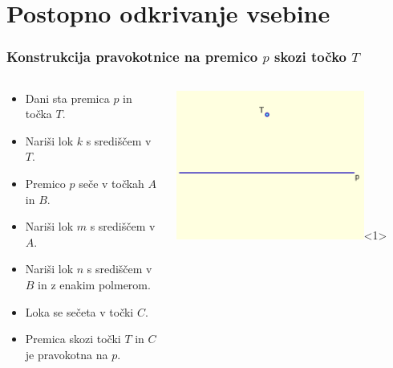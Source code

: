 \documentclass[11pt,hyperref={unicode}]{beamer}
\begin{document}
\section{Postopno odkrivanje vsebine}
\begin{frame}
   \frametitle{Konstrukcija pravokotnice na premico $ p $ skozi točko $ T $}
   \begin{columns}
      \begin{column}{0.5\textwidth}
         \begin{itemize}
            \item <1->Dani sta premica $ p $  in točka $ T $.
            \item <2->Nariši lok $ k $ s središčem v $ T $.
            \item <3->Premico $ p $ seče v točkah $ A $ in $ B $.
            \item <4->Nariši lok  $ m $ s središčem v $ A $.
            \item <5->Nariši lok $ n $ s središčem v $ B $ in z enakim 
            polmerom.
            \item <6->Loka se sečeta v točki $  C $.
            \item <7->Premica skozi točki $ T $ in $ C $ je pravokotna na 
            $ p $.
         \end{itemize}
      \end{column}
      \begin{column}{0.5\textwidth}
         \begin{center}
            \includegraphics[width=0.8\textwidth,keepaspectratio]{pic1.png}<1>

\end{center}
\end{column}
\end{columns}
\end{frame}
\end{document}
